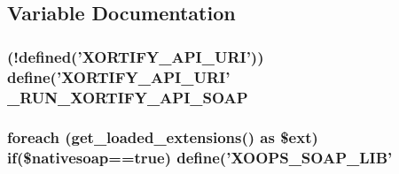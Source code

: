 \subsection{Variable Documentation}
\hypertarget{soap_8php_a07583d496751dd9a708941cbd134b611}{
\subsubsection[{\-\_\-\-R\-U\-N\-\_\-\-X\-O\-R\-T\-I\-F\-Y\-\_\-\-A\-P\-I\-\_\-\-S\-O\-A\-P}]{ (!defined('X\-O\-R\-T\-I\-F\-Y\-\_\-\-A\-P\-I\-\_\-\-U\-R\-I')) define('X\-O\-R\-T\-I\-F\-Y\-\_\-\-A\-P\-I\-\_\-\-U\-R\-I' \-\_\-\-R\-U\-N\-\_\-\-X\-O\-R\-T\-I\-F\-Y\-\_\-\-A\-P\-I\-\_\-\-S\-O\-A\-P}}\label{soap_8php_a07583d496751dd9a708941cbd134b611}
\hypertarget{soap_8php_a6146df301f89432497e6bfe9680af293}{
\subsubsection[{if}]{\setlength{\rightskip}{0pt plus 5cm}foreach (get\-\_\-loaded\-\_\-extensions() as \$ext) if(\$nativesoap==true) define('X\-O\-O\-P\-S\-\_\-\-S\-O\-A\-P\-\_\-\-L\-I\-B'}}\label{soap_8php_a6146df301f89432497e6bfe9680af293}
